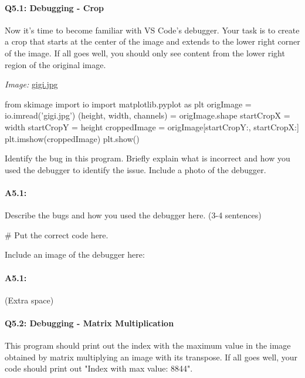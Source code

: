 \documentclass[11pt]{article}
\begin{document}

\pagebreak
\paragraph{Q5.1: Debugging - Crop} Now it's time to become familiar with VS Code's debugger. Your task is to create a crop that starts at the center of the image and extends to the lower right corner of the image. If all goes well, you should only see content from the lower right region of the original image.


\emph{Image:} \href{gigi.jpg}{gigi.jpg}

\begin{python}
from skimage import io
import matplotlib.pyplot as plt
origImage = io.imread('gigi.jpg')
(height, width, channels) = origImage.shape
startCropX = width %
startCropY = height %
croppedImage = origImage[startCropY:, startCropX:]
plt.imshow(croppedImage)
plt.show()
\end{python}
Identify the bug in this program. Briefly explain what is incorrect and how you used the debugger to identify the issue. Include a photo of the debugger.

\paragraph{A5.1: } Describe the bugs and how you used the debugger here. (3-4 sentences)
\begin{python}
# Put the correct code here.
\end{python}

Include an image of the debugger here:

\pagebreak
\paragraph{A5.1:}
(Extra space)

\pagebreak
\paragraph{Q5.2: Debugging - Matrix Multiplication} This program should print out the index with the maximum value in the image obtained by matrix multiplying an image with its transpose. If all goes well, your code should print out "Index with max value: 8844".
\end{document}
